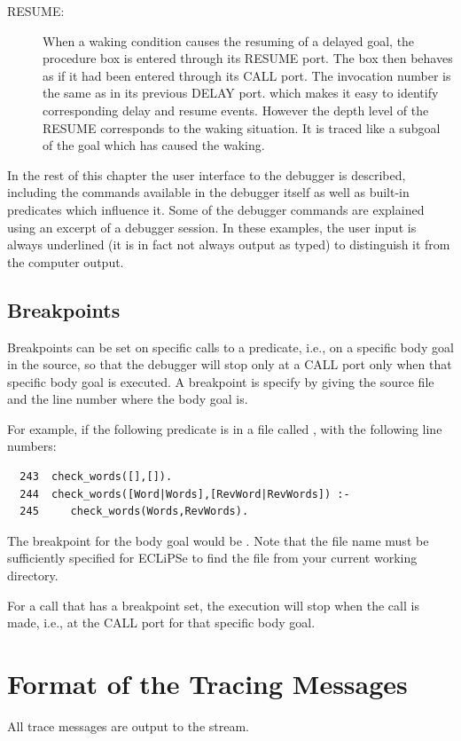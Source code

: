\begin{description}
\item[RESUME:] When a waking condition causes the resuming of
a delayed goal, the procedure box is entered through its RESUME
port.  The box then behaves as if it had been entered through its CALL
port.  The invocation number is the same as in its previous DELAY port.
which makes it easy to identify corresponding delay and resume events.
However the depth level of the RESUME corresponds to the waking situation.
It is traced like a subgoal of the goal which has caused the waking.

\end{description}

In the rest of this chapter the user interface to the debugger is
described, including the commands available in the debugger itself as
well as built-in predicates which influence it.  Some of the debugger
commands are explained using an excerpt of a debugger session.  In
these examples, the user input is always underlined (it is in fact
not always output as typed) to distinguish it from the computer output.

\subsection{Breakpoints}

Breakpoints can be set on specific calls to a predicate, i.e., on a specific
body goal in the source, so that the
debugger will stop only at a CALL port only when that specific body goal is
executed. A breakpoint is specify by giving the source file and the line
number where the body goal is.

For example, if the following predicate is in a file called ,
with the following line numbers:

\begin{verbatim}
  243  check_words([],[]).
  244  check_words([Word|Words],[RevWord|RevWords]) :-
  245     check_words(Words,RevWords).
\end{verbatim}

The breakpoint for the body goal  would
be . Note that the file name must be sufficiently specified
for ECLiPSe to find the file from your current working directory.

For a call that has a breakpoint set, the execution will stop when the call
is made, i.e., at the CALL port for that specific body goal.

\section{Format of the Tracing Messages}
All trace messages are output to the
 stream.

